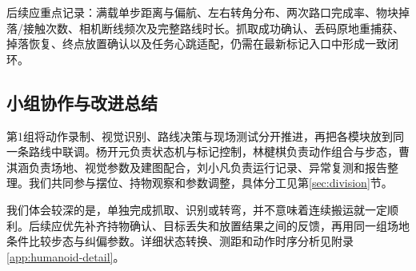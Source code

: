 后续应重点记录：满载单步距离与偏航、左右转角分布、两次路口完成率、物块掉落/接触次数、相机断线频次及完整路线时长。抓取成功确认、丢码原地重捕获、掉落恢复、终点放置确认以及任务心跳适配，仍需在最新标记入口中形成一致闭环。

\subsection{小组协作与改进总结}
第1组将动作录制、视觉识别、路线决策与现场测试分开推进，再把各模块放到同一条路线中联调。杨开元负责状态机与标记控制，林楗棋负责动作组合与步态，曹淇涵负责场地、视觉参数及建图配合，刘小凡负责运行记录、异常复测和报告整理。我们共同参与摆位、持物观察和参数调整，具体分工见第\ref{sec:division}节。

我们体会较深的是，单独完成抓取、识别或转弯，并不意味着连续搬运就一定顺利。后续应优先补齐持物确认、目标丢失和放置结果之间的反馈，再用同一组场地条件比较步态与纠偏参数。详细状态转换、测距和动作时序分析见附录\ref{app:humanoid-detail}。
